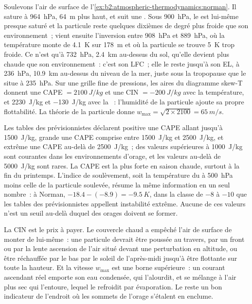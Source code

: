 \begin{example}\label{ex:b2:atmospheric-thermodynamics:cape}
Soulevons l'air de surface de l'\cref{ex:b2:atmospheric-thermodynamics:norman}. Il sature à \qty{964}{hPa},
\qty{64}{m} plus haut, et suit une . Sous \qty{900}{hPa}, le  est
lui-même presque saturé et la particule reste quelques dixièmes de degré plus froide que son environnement~;
vient ensuite l'inversion entre \qty{908}{hPa} et \qty{889}{hPa}, où la température monte de \qty{4.1}{K}
sur \qty{178}{m} et où la particule se trouve \qty{5}{K} trop froide. Ce n'est qu'à \qty{732}{hPa},
\qty{2.4}{km} au-dessus du sol, qu'elle devient plus chaude que son environnement~: c'est son LFC~;
elle le reste jusqu'à son EL, à \qty{236}{hPa}, \qty{10.9}{km} au-dessus du niveau de la mer, juste sous
la tropopause que le  situe à \qty{235}{hPa}. Sur une grille fine de pressions, les aires
du diagramme skew-T donnent une CAPE $= \qty{2100}{J/kg}$ et une CIN $= \qty{-200}{J/kg}$ avec la
température, et \qty{2230}{J/kg} et \qty{-130}{J/kg} avec la ~: l'humidité de la particule
ajoute sa propre flottabilité. La théorie de la particule donne $w_{\max} = \sqrt{2 \times 2100} =
\qty{65}{m/s}$.
\end{example}

Les tables des prévisionnistes déclarent positive une CAPE allant jusqu'à \qty{1500}{J/kg}, grande une CAPE comprise
entre \qty{1500}{J/kg} et \qty{2500}{J/kg}, et extrême une CAPE au-delà de \qty{2500}{J/kg}~; des valeurs supérieures
à \qty{1000}{J/kg} sont courantes dans les environnements d'orage, et les valeurs au-delà de \qty{5000}{J/kg} sont
rares. La CAPE est la plus forte en saison chaude, surtout à la fin du printemps. L'indice de soulèvement, soit la
température du  à \qty{500}{hPa} moins celle de la particule soulevée, résume la même information en un seul
nombre~: à Norman, $-18.4 - (-8.9) = \qty{-9.5}{K}$, dans la classe de $-8$ à $-10$ que les tables des prévisionnistes
appellent instabilité extrême. Aucune de ces valeurs n'est un seuil au-delà duquel des orages doivent se former.

La CIN est le prix à payer. Le couvercle chaud a empêché l'air de surface de monter de lui-même~: une particule
devrait être poussée au travers, par un front ou par la lente ascension de l'air situé devant une perturbation
en altitude, ou être réchauffée par le bas par le soleil de l'après-midi jusqu'à être flottante sur toute
la hauteur. Et la vitesse $w_{\max}$ est une borne supérieure~: un courant ascendant réel emporte son eau
condensée, qui l'alourdit, et se mélange à l'air plus sec qui l'entoure, lequel le refroidit par évaporation.
Le  reste un bon indicateur de l'endroit où les sommets de l'orage s'étalent en enclume.

